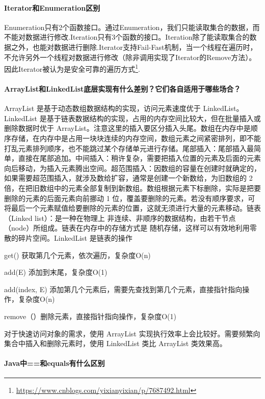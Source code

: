 \documentclass[../../../interview-questions.tex]{subfiles}
\begin{document}
\paragraph{Iterator和Enumeration区别}

Enumeration只有2个函数接口。通过Enumeration，我们只能读取集合的数据，而不能对数据进行修改.Iteration只有3个函数的接口。Iteration除了能读取集合的数据之外，也能对数据进行删除.Iterator支持Fail-Fast机制，当一个线程在遍历时，不允许另外一个线程对数据进行修改（除非调用实现了Iterator的Remove方法）。因此Iterator被认为是安全可靠的遍历方式\footnote{\url{https://www.cnblogs.com/yixianyixian/p/7687492.html}}.


\paragraph{ArrayList和LinkedList底层实现有什么差别？它们各自适用于哪些场合？}

ArrayList 是基于动态数组数据结构的实现，访问元素速度优于 LinkedList。LinkedList 是基于链表数据结构的实现，占用的内存空间比较大，但在批量插入或删除数据时优于 ArrayList。注意这里的插入要区分插入头尾。数组在内存中是顺序存储，在内存中是占用一块块连续的内存空间，数组元素之间紧密排列，即不能打乱元素排列顺序，也不能跳过某个存储单元进行存储。尾部插入：尾部插入最简单，直接在尾部追加。中间插入：稍许复杂，需要把插入位置的元素及后面的元素向后移动，为插入元素腾出空间。超范围插入：因数组的容量在创建时就确定的，如果需要超范围插入，就涉及数给扩容，通常是创建一个新数给，为旧数组的 2 倍，在把旧数组中的元素全部复制到新数组。数组根据元素下标删除，实际是把要删除的元素的后面元素向前挪动 1 位，覆盖要删除的元素。若没有顺序要求，可将最后一个元素赋值给要删除的元素的位置，这就无须进行大量的元素移动。链表（Linked list）：是一种在物理上 非连续、非顺序的数据结构，由若干节点（node）所组成。链表在内存中的存储方式是 随机存储，这样可以有效地利用零散的碎片空间。LinkedList 是链表的操作

get() 获取第几个元素，依次遍历，复杂度O(n)

add(E) 添加到末尾，复杂度O(1)

add(index, E) 添加第几个元素后，需要先查找到第几个元素，直接指针指向操作，复杂度O(n)

remove（）删除元素，直接指针指向操作，复杂度O(1)

对于快速访问对象的需求，使用 ArrayList 实现执行效率上会比较好。需要频繁向集合中插入和删除元素时，使用 LinkedList 类比 ArrayList 类效果高。

\paragraph{Java中==和equals有什么区别}
\end{document}
